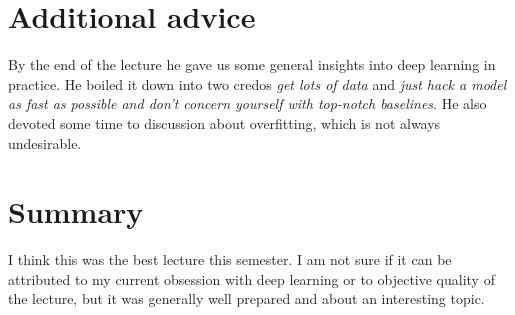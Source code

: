 \documentclass[a4paper]{article}
\begin{document}
\section*{Additional advice}

By the end of the lecture he gave us some general insights into deep learning in practice. He boiled it down into two credos \textit{get lots of data} and \textit{just hack a model as fast as possible and don't concern yourself with top-notch baselines}. He also devoted some time to discussion about overfitting, which is not always undesirable.

\section*{Summary}

I think this was the best lecture this semester. I am not sure if it can be attributed to my current obsession with deep learning or to objective quality of the lecture, but it was generally well prepared and about an interesting topic.
\end{document}

